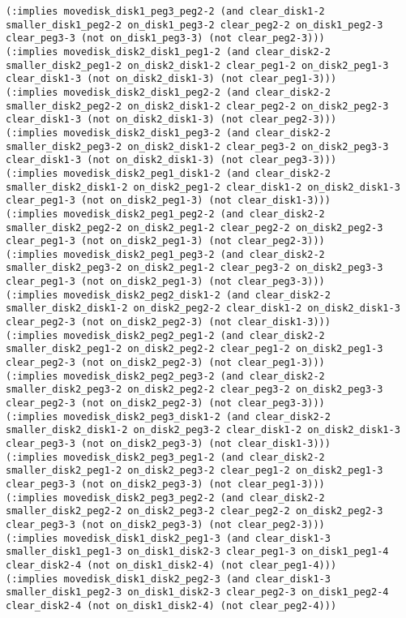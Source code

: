 \documentclass[12pt,letterpaper]{ntdhw}
\begin{document}
\begin{enumerate}
\begin{enumerate}
\begin{lstlisting}[language=pddl, style=pddlstyle,
  basicstyle=\scriptsize]
(:implies movedisk_disk1_peg3_peg2-2 (and clear_disk1-2 smaller_disk1_peg2-2 on_disk1_peg3-2 clear_peg2-2 on_disk1_peg2-3 clear_peg3-3 (not on_disk1_peg3-3) (not clear_peg2-3)))
(:implies movedisk_disk2_disk1_peg1-2 (and clear_disk2-2 smaller_disk2_peg1-2 on_disk2_disk1-2 clear_peg1-2 on_disk2_peg1-3 clear_disk1-3 (not on_disk2_disk1-3) (not clear_peg1-3)))
(:implies movedisk_disk2_disk1_peg2-2 (and clear_disk2-2 smaller_disk2_peg2-2 on_disk2_disk1-2 clear_peg2-2 on_disk2_peg2-3 clear_disk1-3 (not on_disk2_disk1-3) (not clear_peg2-3)))
(:implies movedisk_disk2_disk1_peg3-2 (and clear_disk2-2 smaller_disk2_peg3-2 on_disk2_disk1-2 clear_peg3-2 on_disk2_peg3-3 clear_disk1-3 (not on_disk2_disk1-3) (not clear_peg3-3)))
(:implies movedisk_disk2_peg1_disk1-2 (and clear_disk2-2 smaller_disk2_disk1-2 on_disk2_peg1-2 clear_disk1-2 on_disk2_disk1-3 clear_peg1-3 (not on_disk2_peg1-3) (not clear_disk1-3)))
(:implies movedisk_disk2_peg1_peg2-2 (and clear_disk2-2 smaller_disk2_peg2-2 on_disk2_peg1-2 clear_peg2-2 on_disk2_peg2-3 clear_peg1-3 (not on_disk2_peg1-3) (not clear_peg2-3)))
(:implies movedisk_disk2_peg1_peg3-2 (and clear_disk2-2 smaller_disk2_peg3-2 on_disk2_peg1-2 clear_peg3-2 on_disk2_peg3-3 clear_peg1-3 (not on_disk2_peg1-3) (not clear_peg3-3)))
(:implies movedisk_disk2_peg2_disk1-2 (and clear_disk2-2 smaller_disk2_disk1-2 on_disk2_peg2-2 clear_disk1-2 on_disk2_disk1-3 clear_peg2-3 (not on_disk2_peg2-3) (not clear_disk1-3)))
(:implies movedisk_disk2_peg2_peg1-2 (and clear_disk2-2 smaller_disk2_peg1-2 on_disk2_peg2-2 clear_peg1-2 on_disk2_peg1-3 clear_peg2-3 (not on_disk2_peg2-3) (not clear_peg1-3)))
(:implies movedisk_disk2_peg2_peg3-2 (and clear_disk2-2 smaller_disk2_peg3-2 on_disk2_peg2-2 clear_peg3-2 on_disk2_peg3-3 clear_peg2-3 (not on_disk2_peg2-3) (not clear_peg3-3)))
(:implies movedisk_disk2_peg3_disk1-2 (and clear_disk2-2 smaller_disk2_disk1-2 on_disk2_peg3-2 clear_disk1-2 on_disk2_disk1-3 clear_peg3-3 (not on_disk2_peg3-3) (not clear_disk1-3)))
(:implies movedisk_disk2_peg3_peg1-2 (and clear_disk2-2 smaller_disk2_peg1-2 on_disk2_peg3-2 clear_peg1-2 on_disk2_peg1-3 clear_peg3-3 (not on_disk2_peg3-3) (not clear_peg1-3)))
(:implies movedisk_disk2_peg3_peg2-2 (and clear_disk2-2 smaller_disk2_peg2-2 on_disk2_peg3-2 clear_peg2-2 on_disk2_peg2-3 clear_peg3-3 (not on_disk2_peg3-3) (not clear_peg2-3)))
(:implies movedisk_disk1_disk2_peg1-3 (and clear_disk1-3 smaller_disk1_peg1-3 on_disk1_disk2-3 clear_peg1-3 on_disk1_peg1-4 clear_disk2-4 (not on_disk1_disk2-4) (not clear_peg1-4)))
(:implies movedisk_disk1_disk2_peg2-3 (and clear_disk1-3 smaller_disk1_peg2-3 on_disk1_disk2-3 clear_peg2-3 on_disk1_peg2-4 clear_disk2-4 (not on_disk1_disk2-4) (not clear_peg2-4)))

\end{lstlisting}
\end{enumerate}
\end{enumerate}
\end{document}
